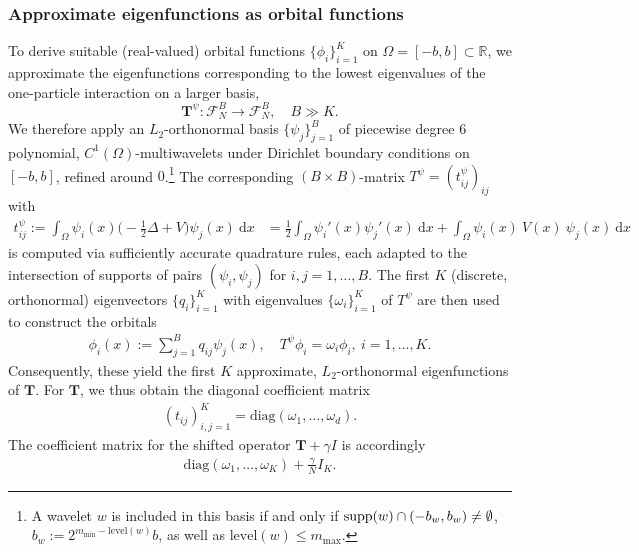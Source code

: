 \documentclass[a4paper,11pt,oneside]{amsart}
\newcommand\supp{\mathop{\rm supp}}
\theoremstyle{definition}
\theoremstyle{remark}
\newcommand{\R}{\mathbb{R}}
\newcommand{\ten}[1]{\boldsymbol{#1}}
\numberwithin{equation}{section}
\numberwithin{theorem}{section}
\begin{document}
\subsubsection{Approximate eigenfunctions as orbital functions}\label{sec:approxeigen}
%
To derive suitable (real-valued) orbital functions $\{\phi_i\}_{i = 1}^K$ on $\Omega = [-b,b] \subset \R$, we approximate the eigenfunctions corresponding to the lowest eigenvalues of the one-particle interaction on a larger basis,
$$\ten T^{\psi}: \mathcal{F}_N^B \rightarrow \mathcal{F}_N^B, \quad B \gg K.$$ %
We therefore apply an $L_2$-orthonormal basis $\{\psi_j\}_{j = 1}^B$ of piecewise degree $6$ polynomial, $C^1(\Omega)$-multiwavelets \cite{DGH:99} under Dirichlet boundary conditions on $[-b,b]$, refined around $0$.\footnote{A wavelet $w$ is included in this basis if and only if $\supp(w) \cap (-b_w,b_w) \neq \emptyset$, $b_w := 2^{m_{\min}-\mathrm{level}(w)} b$, as well as $\mathrm{level}(w) \leq m_{\max}$.}
%
%
The corresponding $(B \times B)$-matrix $T^\psi = (t^{\psi}_{ij})_{ij}$ with
\begin{align*}
 t^{\psi}_{ij} := \int_\Omega \psi_i(x)\big( - \textstyle \frac12 \displaystyle \Delta + V \big) \psi_j(x) \ \mathrm{d}x &= \frac{1}{2} \int_\Omega \psi_i'(x) \psi_j'(x) \ \mathrm{d}x + \int_\Omega \psi_i(x)\ V(x)\ \psi_j(x) \ \mathrm{d}x
\end{align*}
is computed via sufficiently accurate quadrature rules, each adapted to the intersection of supports of pairs $(\psi_i,\psi_j)$ for $i,j = 1,\ldots,B$. The first $K$ (discrete, orthonormal) eigenvectors $\{q_i\}_{i = 1}^K$ with eigenvalues $\{\omega_i\}_{i = 1}^K$ of $T^\psi$ are then used to construct the orbitals
\begin{align*}
 \phi_i(x) := \sum_{j = 1}^B q_{ij} \psi_j(x), \quad T^\psi \phi_i = \omega_i \phi_i, \ i = 1,\ldots,K.
\end{align*}
Consequently, these yield the first $K$ approximate, $L_2$-orthonormal eigenfunctions of $\ten T$. 
For $\ten T$, we thus obtain the diagonal coefficient matrix
\begin{align*}
 (t_{ij})_{i,j = 1}^K = \mathrm{diag}(\omega_1,\ldots,\omega_d).
\end{align*}
The coefficient matrix for the shifted operator $\ten T + \gamma I$ is accordingly \begin{align*}
   \mathrm{diag}(\omega_1,\ldots,\omega_K) + \frac{\gamma}{N} I_K.                                                                                        
\end{align*}
\end{document}
